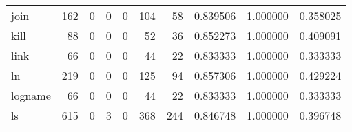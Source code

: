 \begin{longtable}{lrrrrrrrrr}
join      &                                   162 &                                                  0 &                                                  0 &                                                  0 &                                                104 &                                                 58 &                                           0.839506 &                               1.000000 &                             0.358025 \\
kill      &                                    88 &                                                  0 &                                                  0 &                                                  0 &                                                 52 &                                                 36 &                                           0.852273 &                               1.000000 &                             0.409091 \\
link      &                                    66 &                                                  0 &                                                  0 &                                                  0 &                                                 44 &                                                 22 &                                           0.833333 &                               1.000000 &                             0.333333 \\
ln        &                                   219 &                                                  0 &                                                  0 &                                                  0 &                                                125 &                                                 94 &                                           0.857306 &                               1.000000 &                             0.429224 \\
logname   &                                    66 &                                                  0 &                                                  0 &                                                  0 &                                                 44 &                                                 22 &                                           0.833333 &                               1.000000 &                             0.333333 \\
ls        &                                   615 &                                                  0 &                                                  3 &                                                  0 &                                                368 &                                                244 &                                           0.846748 &                               1.000000 &                             0.396748 \\

\end{longtable}
